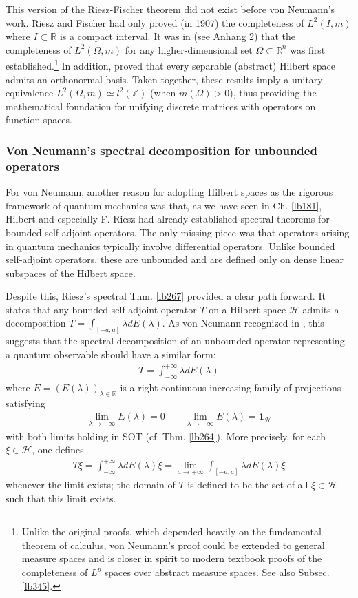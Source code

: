 \documentclass[12pt,b5paper,notitlepage]{article}
\theoremstyle{definition}
\theoremstyle{plain}
\newcommand{\idt}{\mathbf{1}}
\newcommand{\Zbb}{\mathbb Z}
\newcommand{\Rbb}{\mathbb R}
\newcommand{\MH}{\mathcal H}
\numberwithin{equation}{section}
\begin{document}
This version of the Riesz-Fischer theorem did not exist before von Neumann's work. Riesz and Fischer had only proved (in 1907) the completeness of $L^2(I,m)$ where $I\subset\Rbb$ is a compact interval. It was in \cite{vN27} (see Anhang 2) that the completeness of $L^2(\Omega,m)$ for any higher-dimensional set $\Omega\subset\Rbb^n$ was first established.\footnote{Unlike the original proofs, which depended heavily on the fundamental theorem of calculus, von Neumann's proof could be extended to general measure spaces and is closer in spirit to modern textbook proofs of the completeness of $L^p$ spaces over abstract measure spaces. See also Subsec. \ref{lb345}.} In addition, \cite{vN27} proved that every separable (abstract) Hilbert space admits an orthonormal basis. Taken together, these results imply a unitary equivalence $L^2(\Omega,m)\simeq l^2(\Zbb)$ (when $m(\Omega)>0$), thus providing the mathematical foundation for unifying discrete matrices with operators on function spaces.



\subsubsection{Von Neumann's spectral decomposition for unbounded operators}\label{lb375}


For von Neumann, another reason for adopting Hilbert spaces as the rigorous framework of quantum mechanics was that, as we have seen in Ch. \ref{lb181}, Hilbert and especially F. Riesz had already established spectral theorems for bounded self-adjoint operators. The only missing piece was that operators arising in quantum mechanics typically involve differential operators. Unlike bounded self-adjoint operators, these are unbounded and are defined only on dense linear subspaces of the Hilbert space.

Despite this, Riesz's spectral Thm. \ref{lb267} provided a clear path forward. It states that any bounded self-adjoint operator $T$ on a Hilbert space $\MH$ admits a decomposition $T=\int_{[-a,a]}\lambda dE(\lambda)$. As von Neumann recognized in \cite{vN27}, this suggests that the spectral decomposition of an unbounded operator representing a quantum observable should have a similar form:
\begin{align}\label{eq188}
T=\int_{-\infty}^{+\infty}\lambda dE(\lambda)
\end{align}
where $E=(E(\lambda))_{\lambda\in\Rbb}$ is a right-continuous increasing family of projections satisfying
\begin{align*}
\lim_{\lambda\rightarrow-\infty}E(\lambda)=0\qquad \lim_{\lambda\rightarrow+\infty}E(\lambda)=\idt_\MH
\end{align*}
with both limits holding in SOT (cf. Thm. \ref{lb264}). More precisely, for each $\xi\in\MH$, one defines
\begin{align*}
T\xi=\int_{-\infty}^{+\infty}\lambda dE(\lambda)\xi=\lim_{a\rightarrow+\infty}\int_{[-a,a]}\lambda dE(\lambda)\xi
\end{align*} 
whenever the limit exists; the domain of $T$ is defined to be the set of all $\xi\in\MH$ such that this limit exists. 
\end{document}
